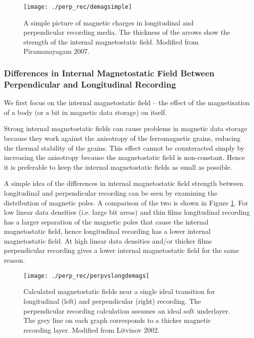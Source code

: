 \begin{figure}[!ht]
  \center
  \texttt{[image: ./perp\_rec/demagsimple]}
  \caption{
    A simple picture of magnetic charges in longitudinal and perpendicular
    recording media. The thickness of the arrows show the strength of the
    internal magnetostatic field.  Modified from Piramanayagam
    2007. \cite{Piramanayagam2007a}}
  \label{fig:simple-picture-demag}
\end{figure}


\subsubsection{Differences in Internal Magnetostatic Field Between Perpendicular and Longitudinal Recording}
\label{sec:diff-intern-magn}
We first focus on the internal magnetostatic field -- the effect of the magnetisation of a body (or a bit in magnetic data storage) on itself.

Strong internal magnetostatic fields can cause problems in magnetic data storage
because they work against the anisotropy of the ferromagnetic grains, reducing
the thermal stability of the grains. This effect cannot be counteracted simply
by increasing the anisotropy because the magnetostatic field is
non-constant. Hence it is preferable to keep the internal magnetostatic fields
as small as possible.

A simple idea of the differences in internal magnetostatic field strength between
longitudinal and perpendicular recording can be seen by examining the
distribution of magnetic poles. A comparison of the two is shown in Figure
\ref{fig:simple-picture-demag}. For low linear data densities (i.e. large bit areas)
and thin films longitudinal recording has a larger separation of the magnetic
poles that cause the internal magnetostatic field, hence longitudinal recording has a
lower internal magnetostatic field. At high linear data densities and/or thicker films
perpendicular recording gives a lower internal magnetostatic field for the same
reason.\cite{Piramanayagam2007a}

\begin{figure}[!ht]
  \center
  \texttt{[image: ./perp\_rec/perpvslongdemags]}
  \caption{Calculated magnetostatic fields near a single ideal transition for
    longitudinal (left) and perpendicular (right) recording. The perpendicular
    recording calculation assumes an ideal soft underlayer. The grey line on each
    graph corresponds to a thicker magnetic recording layer. Modified from Litvinov
    2002\cite{Litvinov2002}.}
  \label{fig:Calculated-demagnetising-fields}
\end{figure}

